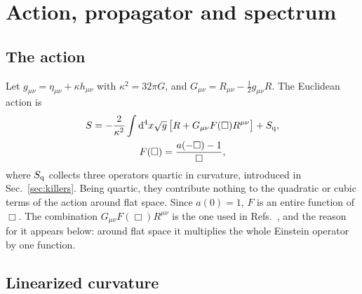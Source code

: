 \documentclass[a4paper,11pt]{article}
\newcommand{\dd}{\mathrm{d}}
\begin{document}
\section{Action, propagator and spectrum}
\label{sec:action}

\subsection{The action}

Let $g_{\mu\nu}=\eta_{\mu\nu}+\kappa h_{\mu\nu}$ with $\kappa^2=32\pi G$, and $G_{\mu\nu}=R_{\mu\nu}-\frac12g_{\mu\nu}R$. The Euclidean action is
\begin{multline}
\label{eq:action}
S=-\frac2{\kappa^2}\int\dd^4x\sqrt g\,\bigl[R+G_{\mu\nu}F(\Box)R^{\mu\nu}\bigr]+S_{\rm q},\\
F(\Box)=\frac{a(-\Box)-1}{\Box},
\end{multline}
where $S_{\rm q}$ collects three operators quartic in curvature, introduced in Sec.~\ref{sec:killers}. Being quartic, they contribute nothing to the quadratic or cubic terms of the action around flat space. Since $a(0)=1$, $F$ is an entire function of $\Box$. The combination $G_{\mu\nu}F(\Box)R^{\mu\nu}$ is the one used in Refs.~\cite{Tomboulis1997,Modesto2012}, and the reason for it appears below: around flat space it multiplies the whole Einstein operator by one function.

\subsection{Linearized curvature}
\end{document}
